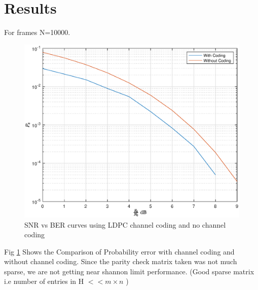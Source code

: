 \documentclass[journal,12pt,twocolumn]{IEEEtran}
\begin{document}
\section{Results}
For frames N=10000.
 \begin{figure}[!ht]
\begin{center}
\includegraphics[width=\columnwidth]{./figs/ber}
\caption{SNR vs BER curves using LDPC channel coding and no channel coding}
\label{fig : ber}
\end{center}
\end{figure}
Fig \ref{fig : ber} Shows the Comparison of Probability error with channel coding and without channel coding. Since the parity check matrix taken was not much sparse, we are not getting near shannon limit performance. (Good sparse matrix i.e number of entries in H $<< m\times n $ )


\end{document}
